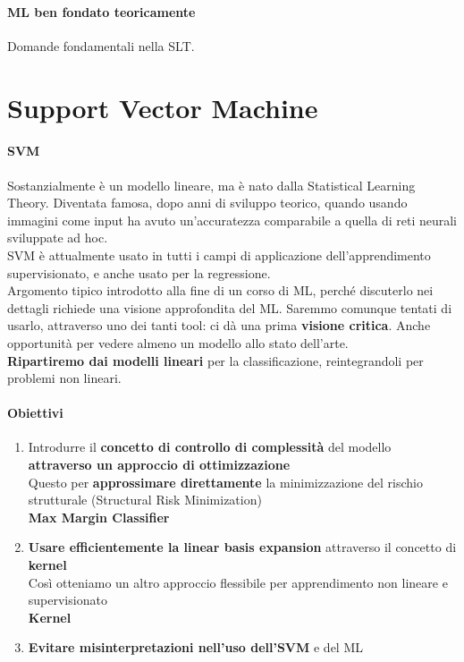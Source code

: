 \documentclass[10pt]{book}
\begin{document}
\paragraph{ML ben fondato teoricamente} Domande fondamentali nella SLT.
\section{Support Vector Machine}
\paragraph{SVM} Sostanzialmente è un modello lineare, ma è nato dalla Statistical Learning Theory. Diventata famosa, dopo anni di sviluppo teorico, quando usando immagini come input ha avuto un'accuratezza comparabile a quella di reti neurali sviluppate ad hoc.\\
SVM è attualmente usato in tutti i campi di applicazione dell'apprendimento supervisionato, e anche usato per la regressione.\\
Argomento tipico introdotto alla fine di un corso di ML, perché discuterlo nei dettagli richiede una visione approfondita del ML. Saremmo comunque tentati di usarlo, attraverso uno dei tanti tool: ci dà una prima \textbf{visione critica}. Anche opportunità per vedere almeno un modello allo stato dell'arte.\\
\textbf{Ripartiremo dai modelli lineari} per la classificazione, reintegrandoli per problemi non lineari.
\paragraph{Obiettivi} \begin{enumerate}
	\item Introdurre il \textbf{concetto di controllo di complessità} del modello \textbf{attraverso un approccio di ottimizzazione}\\
	Questo per \textbf{approssimare direttamente} la minimizzazione del rischio strutturale (Structural Risk Minimization)\\
	\textbf{Max Margin Classifier}
	\item \textbf{Usare efficientemente la linear basis expansion} attraverso il concetto di \textbf{kernel}\\
	Così otteniamo un altro approccio flessibile per apprendimento non lineare e supervisionato\\
	\textbf{Kernel}
	\item \textbf{Evitare misinterpretazioni nell'uso dell'SVM} e del ML
\end{enumerate}
\end{document}
